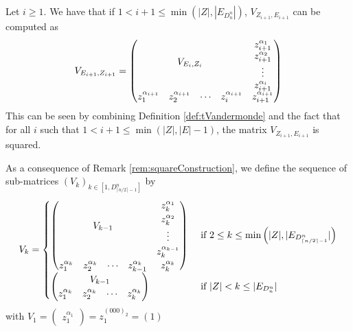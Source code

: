 \documentclass[11pt]{llncs}
\begin{document}
\begin{remark}\label{rem:squareConstruction}
    Let $i\geq 1$. We have that if $1< i+1 \leq \min{\left(|Z|, |E_{D_n^n}|\right)}$, $V_{Z_{i+1}, E_{i+1}}$ can be computed as
    \begin{align*}
        V_{E_{i+1}, Z_{i+1}} = 
        \begin{pmatrix}
        \multicolumn{4}{c}{\multirow{4}{*}{$V_{E_{i}, Z_{i}}$}} & z_{i+1}^{\alpha_{1}}\\
        & & & & z_{i+1}^{\alpha_{2}}\\
        & & & & \vdots\\
        & & & & z_{i+1}^{\alpha_{i}}\\
        z_1^{\alpha_{i+1}} & z_2^{\alpha_{i+1}}& \cdots & z_{i}^{\alpha_{i+1}} & z_{i+1}^{\alpha_{i+1}}
    \end{pmatrix}
    \end{align*}
    This can be seen by combining Definition \ref{def:tVandermonde} and the fact that for all $i$ such that $1< i+1 \leq \min{\left(|Z|, |E|-1\right)}$, the matrix $V_{Z_{i+1}, E_{i+1}}$ is squared.
\end{remark}

\begin{definition}\label{def:inductiveConstructionOfV}
    As a consequence of Remark \ref{rem:squareConstruction}, we define the sequence of sub-matrices $\left(V_k\right)_{k\in [1,D_{\lceil{n/2}\rceil-1}^n]}$ by
    \begin{align*}
        V_k = 
        \begin{cases}
            \begin{pmatrix}
        \multicolumn{4}{c}{\multirow{4}{*}{$V_{k-1}$}} & z_k^{\alpha_{1}}\\
        & & & & z_k^{\alpha_{2}}\\
        & & & & \vdots\\
        & & & & z_k^{\alpha_{k-1}}\\
        z_1^{\alpha_{k}} & z_{2}^{\alpha_k}& \cdots & z_{k-1}^{\alpha_{k}} & z_{k}^{\alpha_{k}}
    \end{pmatrix} & \mbox{ if } 2\leq k \leq \min{\left(|Z|, |E_{D_{\lceil{n/2}\rceil-1}^n}|\right)}\\
    \begin{pmatrix}
        \multicolumn{4}{c}{\multirow{1}{*}{$V_{k-1}$}} \\
        z_1^{\alpha_k} & z_2^{\alpha_k} & \cdots & z_{k}^{\alpha_k}
    \end{pmatrix} & \mbox{ if } |Z| < k \leq |E_{D_n^n}|
        \end{cases}
    \end{align*}
    with $V_1 = \begin{pmatrix} z_1^{\alpha_1}\end{pmatrix} = z_1^{(000)_2} = (1)$ 
\end{definition}
\end{document}
